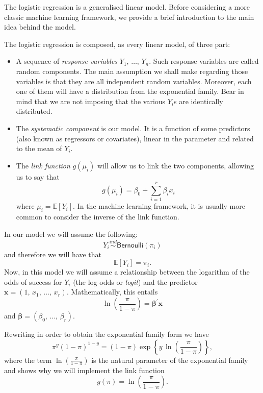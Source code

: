 \documentclass[a4paper]{article}
\begin{document}
The logistic regression is a generalised linear model. Before considering
a more classic machine learning framework, we provide a brief introduction
to the main idea behind the model. 

The logistic regression is composed, as every linear model, of three
part:
\begin{itemize}
	\item A sequence of \textit{response variables} $Y_{1},\,\ldots,\,Y_{n}$.
	Such response variables are called random components. The main assumption
	we shall make regarding those variables is that they are all independent
	random variables. Moreover, each one of them will have a distribution
	from the exponential family. Bear in mind that we are not imposing
	that the various $Y_{i}$s are identically distributed.
	\item The \textit{systematic component} is our model. It is a function of
	some predictors (also known as regressors or covariates), linear in
	the parameter and related to the mean of $Y_{i}$.
	\item The \textit{link function} $g\left(\mu_{i}\right)$ will allow us
	to link the two components, allowing us to say that 
	\begin{equation}
	g\left(\mu_{i}\right)=\beta_{0}+\sum_{i=1}^{r}\beta_{i}x_{i}\label{eq:-3}
	\end{equation}
	where $\mu_{i}=\mathbb{E}\left[Y_{i}\right]$. In the machine learning
	framework, it is usually more common to consider the inverse of the
	link function.
\end{itemize}
In our model we will assume the following:
\begin{equation}
Y_{i}\overset{ind}{\sim}\mathsf{Bernoulli}\left(\pi_{i}\right)\label{eq:}
\end{equation}
and therefore we will have that 
\begin{equation}
\mathbb{E}\left[Y_{i}\right]=\pi_{i}.\label{eq:-1}
\end{equation}
Now, in this model we will assume a relationship between the logarithm
of the odds of success for $Y_{i}$ (the log odds or \textit{logit})
and the predictor $\mathbf{x}=\left(1,\,x_{1},\,\ldots,\,x_{r}\right)$.
Mathematically, this entails
\begin{equation}
\ln\left(\frac{\pi}{1-\pi}\right)=\mathbf{\beta^{\prime}\mathbf{x}}\label{eq:-6}
\end{equation}
and $\mathbf{\beta}=\left(\beta_{0},\,\ldots,\,\beta_{r}\right)$.

Rewriting in order to obtain the exponential family form we have
\begin{equation}
\pi^{y}\left(1-\pi\right)^{1-y}=\left(1-\pi\right)\exp\left\{ y\,\ln\left(\frac{\pi}{1-\pi}\right)\right\} ,\label{eq:-2}
\end{equation}
where the term $\ln\left(\frac{\pi}{1-\pi}\right)$ is the natural
parameter of the exponential family and shows why we will implement
the link function
\begin{equation}
g\left(\pi\right)=\ln\left(\frac{\pi}{1-\pi}\right).\label{eq:-4}
\end{equation}
\end{document}
